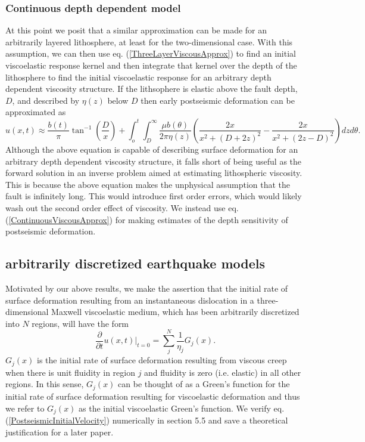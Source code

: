 \documentclass[extra]{gji}
\begin{document}
\subsubsection{Continuous depth dependent model}
At this point we posit that a similar approximation can be made for an
arbitrarily layered lithosphere, at least for the two-dimensional
case.  With this assumption, we can then use
eq. (\ref{ThreeLayerViscousApprox}) to find an initial viscoelastic
response kernel and then integrate that kernel over the depth of the
lithosphere to find the initial viscoelastic response for an arbitrary
depth dependent viscosity structure.  If the lithsophere is elastic
above the fault depth, $D$, and described by $\eta(z)$ below $D$ then
early postseismic deformation can be approximated as
\begin{equation}\label{ContinuousViscousApprox}
u(x,t) \approx \frac{b(t)}{\pi}\tan^{-1}(\frac{D}{x}) + 
               \int_o^t\int_D^\infty \frac{\mu b(\theta)}{2\pi\eta(z)}
                                    \left(\frac{2x}{x^2 + \left(D + 2z\right)^2} - 
                                    \frac{2x}{x^2 + \left(2z - D\right)^2}\right)
                                    dz d\theta.
\end{equation}
Although the above equation is capable of describing surface
deformation for an arbitrary depth dependent viscosity structure, it
falls short of being useful as the forward solution in an inverse
problem aimed at estimating lithospheric viscosity.  This is because
the above equation makes the unphysical assumption that the fault is
infinitely long.  This would introduce first order errors, which would
likely wash out the second order effect of viscosity. We instead use
eq. (\ref{ContinuousViscousApprox}) for making estimates of the depth
sensitivity of postseismic deformation.

\subsection{arbitrarily discretized earthquake models}
Motivated by our above results, we make the assertion that the initial
rate of surface deformation resulting from an instantaneous
dislocation in a three-dimensional Maxwell viscoelastic
medium, which has been arbitrarily discretized into $N$ regions, will
have the form
\begin{equation}\label{PostseismicInitialVelocity}
  \frac{\partial}{\partial t}u(x,t)\big|_{t=0} = \sum_j^N\frac{1}{\eta_j}G_j(x).
\end{equation}
$G_j(x)$ is the initial rate of surface deformation resulting from
viscous creep when there is unit fluidity in region $j$ and fluidity
is zero (i.e. elastic) in all other regions.  In this sense, $G_j(x)$
can be thought of as a Green's function for the initial rate of
surface deformation resulting for viscoelastic deformation and thus we
refer to $G_j(x)$ as the initial viscoelastic Green's function.  We
verify eq. (\ref{PostseismicInitialVelocity}) numerically in section 5.5
and save a theoretical justification for a later paper.
\end{document}

